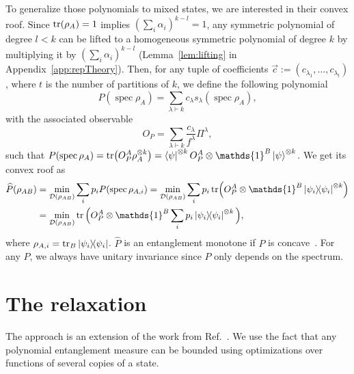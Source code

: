 \documentclass[11pt,a4paper]{report}
\DeclareMathOperator{\spec}{spec}
\newcommand{\one}{\mathds{1}}
\newcommand{\I}{\one}
\renewcommand{\a}{\alpha}
\newcounter{reptag}
\newif\iftags \tagsfalse   %
\newcommand{\reptagbox}[3]{\iftags\par\smallskip\noindent\refstepcounter{reptag}%
  \fcolorbox{#1}{#1!7}{\parbox{\dimexpr\linewidth-2\fboxsep-2\fboxrule\relax}{\small
  \textcolor{#1}{\textbf{[\thereptag]\ #2.}}\ #3}}\par\smallskip\fi}
\newcommand{\detail}[1]{\reptagbox{tagD}{More detail}{#1}}
\begin{document}
To generalize those polynomials to mixed states, we are interested in their convex roof.
Since $\tr(\rho_A) = 1$ implies $(\sum_i\a_i)^{k-l} = 1$, any symmetric polynomial of degree $l < k$ can be lifted to a homogeneous symmetric polynomial of degree $k$ by multiplying it by $(\sum_i\a_i)^{k-l}$ (Lemma~\ref{lem:lifting} in Appendix~\ref{app:repTheory}).
Then, for any tuple of coefficients $\vec{c}:=(c_{\lambda_1},\dots,c_{\lambda_t})$, where $t$ is the number of partitions of $k$, we define the following polynomial
\begin{equation}
    P(\spec\rho_A) = \sum_{\lambda\vdash k}c_\lambda s_\lambda(\spec\rho_A),
\end{equation}
with the associated observable
\begin{equation}\label{eq:OP}
    O_P = \sum_{\lambda \vdash k} \frac{c_\lambda}{f^\lambda} \Pi^\lambda,
\end{equation}
such that $P(\spec \rho_A) = \tr(O_P^A \rho_A^{\otimes k})= \bra{\psi}^{\otimes k} O_P^A \otimes \I^B \ket{\psi}^{\otimes k}$. We get its convex roof as
\begin{align}
    \widehat{P}(\rho_{AB}) &= \min_{\mathcal{D}(\rho_{AB})} \sum_i p_i P(\spec \rho_{A,i}) = \min_{\mathcal{D}(\rho_{AB})} \sum_i p_i \tr(O_P^A \otimes \I^B \dyad{\psi_i}^{\otimes k})\notag\\
    &= \min_{\mathcal{D}(\rho_{AB})} \tr\Big( O_P^A \otimes \I^B \sum_i p_i \dyad{\psi_i}^{\otimes k}\Big),\label{eq:PrhoABcroof}
\end{align}
where $\rho_{A,i}=\tr_B\dyad{\psi_i}$. $\widehat{P}$ is an entanglement monotone if $P$ is concave~\cite{Vidal_2000}. For any $P$, we always have unitary invariance since $P$ only depends on the spectrum.
\detail{Spell out the identity the whole method rests on, which is only implicit here: $P(\spec\rho_{A,i})=\tr(O_P\,\rho_{A,i}^{\otimes k})=\tr\big((O_P\otimes\I^B)\dyad{\psi_i}^{\otimes k}\big)$, so $\sum_ip_iP(\psi_i)=\tr\big((O_P\otimes\I^B)\,\omega_k\big)$ is \emph{linear} in the operator $\omega_k$ of Eq.~\eqref{eq:omega}. With this computation in front, the next section reads naturally.}

\section{The relaxation}
The approach is an extension of the work from Ref.~\cite{Toth2015CroofTP}. We use the fact that any polynomial entanglement measure can be bounded using optimizations over functions of several copies of a state.
\end{document}
